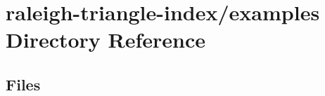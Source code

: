 \section{raleigh-\/triangle-\/index/examples Directory Reference}
\label{dir_83e127584e40bbc559255eecdbc701f2}
\subsection*{Files}
\begin{DoxyCompactItemize}
\end{DoxyCompactItemize}
